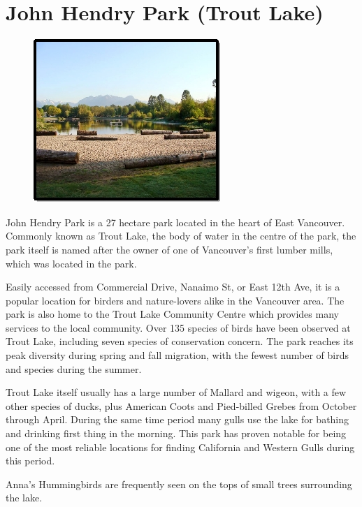 \section{John Hendry Park (Trout Lake)}

\begin{figure}[h]
  \centering
    \includegraphics{tlcover.jpg}
\end{figure}

John Hendry Park is a 27 hectare park located in the heart of East Vancouver. Commonly known as Trout Lake, the body of water in the centre of the park, the park itself is named after the owner of one of Vancouver’s first lumber mills, which was located in the park. 

Easily accessed from Commercial Drive, Nanaimo St, or East 12th Ave, it is a popular location for birders and nature-lovers alike in the Vancouver area. The park is also home to the Trout Lake Community Centre which provides many services to the local community. Over 135 species of birds have been observed at Trout Lake, including seven species of conservation concern. The park reaches its peak diversity during spring and fall migration, with the fewest number of birds and species during the summer. 

Trout Lake itself usually has a large number of Mallard and wigeon, with a few other species of ducks, plus American Coots and Pied-billed Grebes from October through April. During the same time period many gulls use the lake for bathing and drinking first thing in the morning. This park has proven notable for being one of the most reliable locations for finding California and Western Gulls during this period. 

Anna’s Hummingbirds are frequently seen on the tops of small trees surrounding the lake.

